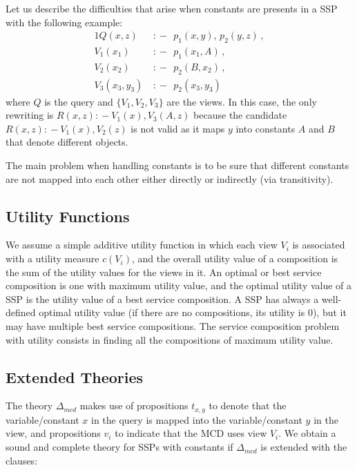 \documentclass{llncs}
\newcommand{\qrule}{:\!\!-}
\begin{document}
Let us describe the difficulties that arise when constants
are presents in a SSP with the following example:
\begin{alignat*}{1}
Q(x,z)\ &\qrule\ \ p_1(x,y),\, p_2(y,z)\,, \\
V_1(x_1)\ &\qrule\ \ p_1(x_1,A)\,, \\
V_2(x_2)\ &\qrule\ \ p_2(B,x_2)\,, \\
V_3(x_3,y_3)\ &\qrule\ \ p_2(x_3,y_3)
\end{alignat*}
where $Q$ is the query and $\{V_1,V_2,V_3\}$ are the 
views. In this case, the only rewriting is 
$R(x,z)\qrule V_1(x),V_3(A,z)$ because the candidate 
$R(x,z)\qrule V_1(x),V_2(z)$ is not valid as it maps
$y$ into constants $A$ and $B$ that denote different
objects.

The main problem when handling constants is to
be sure that different constants are not mapped into
each other either directly or indirectly (via transitivity).

\subsection{Utility Functions}

We assume a simple additive utility function in which each view
$V_i$ is associated with a utility measure $c(V_i)$, and the overall utility value of
a composition is the sum of the utility values for the views in it.
An optimal or best service composition is one with maximum utility value,
and the optimal utility value of a SSP is the utility value of a best
service composition. A SSP has always a well-defined optimal
utility value (if there are no compositions, its utility is $0$),
but it may have multiple best service compositions.
The service composition problem with utility consists in finding
all the compositions of maximum utility value.



\subsection{Extended Theories}

The theory $\Delta_{mcd}$ makes use of propositions $t_{x,y}$
to denote that the variable/constant $x$ in the query is mapped
into the variable/constant $y$ in the view, and propositions $v_i$
to indicate that the MCD uses view $V_i$.
We obtain a sound and complete theory for SSPs with constants if
$\Delta_{mcd}$ is extended with the clauses:
\end{document}

